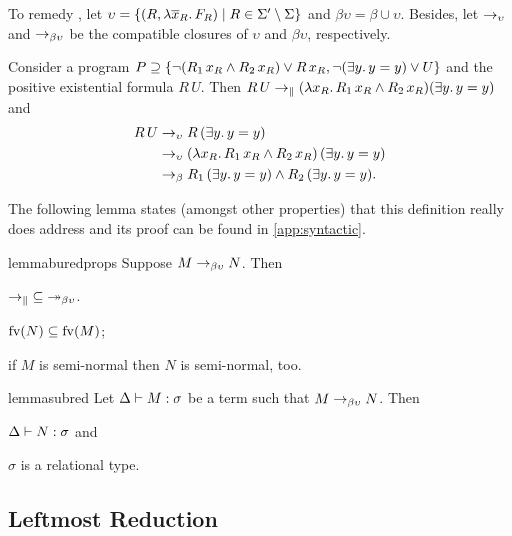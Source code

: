 \documentclass[a4paper,twoside,notitlepage,openright,11pt]{report}
\begin{document}
To remedy , let $\upsilon=\{(R,\lambda\overline x_R\ldotp F_R)\mid R\in\Sigma'\setminus\Sigma\}$ and $\beta\upsilon=\beta\cup\upsilon$. Besides, let $\rightarrow_\upsilon$ and $\rightarrow_{\beta\upsilon}$ be the compatible closures of $\upsilon$ and $\beta\upsilon$, respectively.
\begin{example}
  \label{ex:reduction1}
  Consider a program $P\supseteq\{\neg (R_1\,x_R\land R_2\,x_R)\lor R\,x_R,\neg (\exists y\ldotp y=y)\lor U\}$ and the positive existential formula $R\,U$. Then $R\,U\rightarrow_\parallel (\lambda x_R\ldotp R_1\,x_R\land R_2\,x_R)(\exists y\ldotp y=y)$ and
  \begin{align*}
    R\,U&\rightarrow_\upsilon R\,(\exists y\ldotp y=y)\\
        &\rightarrow_\upsilon (\lambda x_R\ldotp R_1\,x_R\land R_2\,x_R)\,(\exists y\ldotp y=y)\\
        &\rightarrow_\beta R_1\,(\exists y\ldotp y=y)\land R_2\,(\exists y\ldotp y=y).
  \end{align*}
\end{example}
The following lemma states (amongst other properties) that this definition really does address  and its proof can be found in \cref{app:syntactic}.
\begin{restatable}{lemma}{buredprops}
  Suppose $M\rightarrow_{\beta\upsilon} N$. Then
  \begin{thmlist}
  \item\label{lem:parallelbu} $\rightarrow_\parallel\;\subseteq\;\twoheadrightarrow_{\beta\upsilon}$.
  \item\label{lem:nonewfree} $\operatorname{fv}(N)\subseteq\operatorname{fv}(M)$; 
  \item\label{lem:seminormal} if $M$ is semi-normal then $N$ is semi-normal, too.
  \end{thmlist}
\end{restatable}

\begin{restatable}{lemma}{subred}
  \label{lem:subred2}
  Let $\Delta\vdash M:\sigma$ be a term such that $M\rightarrow_{\beta\upsilon} N$. Then
  \begin{thmlist}
  \item $\Delta\vdash N:\sigma$ and
  \item\label{lem:functionalnobured} $\sigma$ is a relational type.
  \end{thmlist}
\end{restatable}


\subsection{Leftmost Reduction}
\label{sec:leftmost}
\label{SEC:LEFTMOST}
\end{document}
